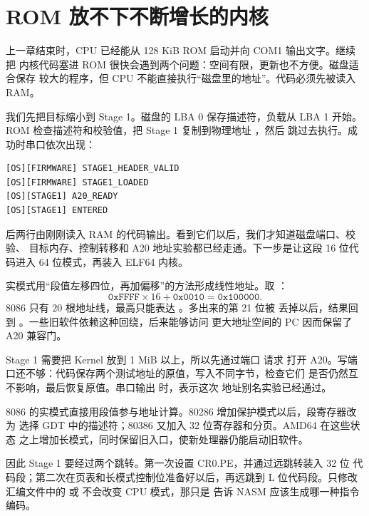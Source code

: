\section{ROM 放不下不断增长的内核}

上一章结束时，CPU 已经能从 128 KiB ROM 启动并向 COM1 输出文字。继续把
内核代码塞进 ROM 很快会遇到两个问题：空间有限，更新也不方便。磁盘适合保存
较大的程序，但 CPU 不能直接执行“磁盘里的地址”。代码必须先被读入 RAM。

我们先把目标缩小到 Stage 1。磁盘的 LBA 0 保存描述符，负载从 LBA 1 开始。
ROM 检查描述符和校验值，把 Stage 1 复制到物理地址 ，然后
跳过去执行。成功时串口依次出现：

\begin{lstlisting}
[OS][FIRMWARE] STAGE1_HEADER_VALID
[OS][FIRMWARE] STAGE1_LOADED
[OS][STAGE1] A20_READY
[OS][STAGE1] ENTERED
\end{lstlisting}

后两行由刚刚读入 RAM 的代码输出。看到它们以后，我们才知道磁盘端口、校验、
目标内存、控制转移和 A20 地址实验都已经走通。下一步是让这段 16 位代码进入
64 位模式，再装入 ELF64 内核。

实模式用“段值左移四位，再加偏移”的方法形成线性地址。取
：
\[
  \mathtt{0xFFFF}\times16+\mathtt{0x0010}
  =\mathtt{0x100000}.
\]
8086 只有 20 根地址线，最高只能表达 。多出来的第 21 位被
丢掉以后，结果回到 。一些旧软件依赖这种回绕，后来能够访问
更大地址空间的 PC 因而保留了 A20 兼容门。

Stage 1 需要把 Kernel 放到 1 MiB 以上，所以先通过端口  请求
打开 A20。写端口还不够：代码保存两个测试地址的原值，写入不同字节，检查它们
是否仍然互不影响，最后恢复原值。串口输出  时，表示这次
地址别名实验已经通过。

8086 的实模式直接用段值参与地址计算。80286 增加保护模式以后，段寄存器改为
选择 GDT 中的描述符；80386 又加入 32 位寄存器和分页。AMD64 在这些状态
之上增加长模式，同时保留旧入口，使新处理器仍能启动旧软件。

因此 Stage 1 要经过两个跳转。第一次设置 CR0.PE，并通过远跳转装入 32 位
代码段；第二次在页表和长模式控制位准备好以后，再远跳到 L 位代码段。只修改
汇编文件中的  或  不会改变 CPU 模式，那只是
告诉 NASM 应该生成哪一种指令编码。

\begin{center}
\end{center}

